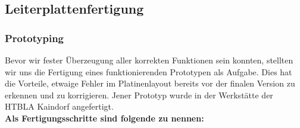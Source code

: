 \newpage
\subsection{Leiterplattenfertigung}

\subsubsection{Prototyping}

Bevor wir fester Überzeugung aller korrekten Funktionen sein konnten, stellten wir uns die Fertigung eines funktionierenden Prototypen als Aufgabe.
Dies hat die Vorteile, etwaige Fehler im Platinenlayout bereits vor der finalen Version zu erkennen und zu korrigieren.
Jener Prototyp wurde in der Werkstätte der HTBLA Kaindorf angefertigt. \\

\textbf{Als Fertigungsschritte sind folgende zu nennen:}

